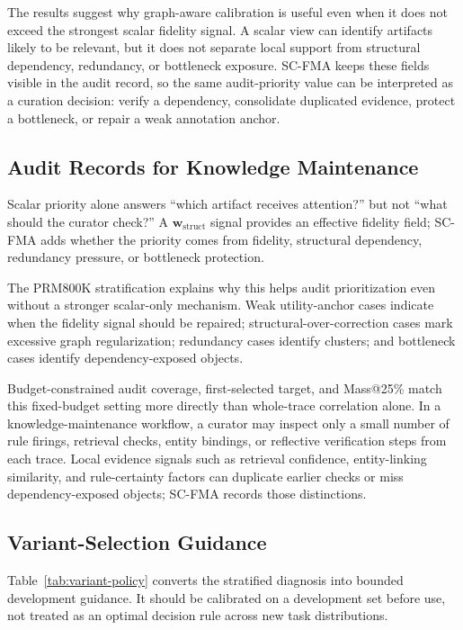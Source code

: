 \documentclass[a4paper,fleqn]{cas-sc}
\newcommand{\wstruct}{\ensuremath{\mathbf{w}_{\mathrm{struct}}}}
\begin{document}
The results suggest why graph-aware calibration is useful even when it does not exceed the strongest scalar fidelity signal. A scalar view can identify artifacts likely to be relevant, but it does not separate local support from structural dependency, redundancy, or bottleneck exposure. SC-FMA keeps these fields visible in the audit record, so the same audit-priority value can be interpreted as a curation decision: verify a dependency, consolidate duplicated evidence, protect a bottleneck, or repair a weak annotation anchor.

\subsection{Audit Records for Knowledge Maintenance}
\label{sec:audit-interpretation}

Scalar priority alone answers ``which artifact receives attention?'' but not ``what should the curator check?'' A \wstruct{} signal provides an effective fidelity field; SC-FMA adds whether the priority comes from fidelity, structural dependency, redundancy pressure, or bottleneck protection.

The PRM800K stratification explains why this helps audit prioritization even without a stronger scalar-only mechanism. Weak utility-anchor cases indicate when the fidelity signal should be repaired; structural-over-correction cases mark excessive graph regularization; redundancy cases identify clusters; and bottleneck cases identify dependency-exposed objects.

Budget-constrained audit coverage, first-selected target, and Mass@25\% match this fixed-budget setting more directly than whole-trace correlation alone. In a knowledge-maintenance workflow, a curator may inspect only a small number of rule firings, retrieval checks, entity bindings, or reflective verification steps from each trace. Local evidence signals such as retrieval confidence, entity-linking similarity, and rule-certainty factors can duplicate earlier checks or miss dependency-exposed objects; SC-FMA records those distinctions.

\subsection{Variant-Selection Guidance}

Table~\ref{tab:variant-policy} converts the stratified diagnosis into bounded development guidance. It should be calibrated on a development set before use, not treated as an optimal decision rule across new task distributions.
\end{document}
